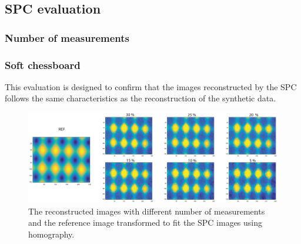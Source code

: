 \subsection{SPC evaluation}
\label{sec:eval_spc}

\subsubsection{Number of measurements}

\subsubsection{Soft chessboard}
This evaluation is designed to confirm that the images reconstructed by the SPC follows the same characteristics as the reconstruction of the synthetic data.

\begin{figure}[H]
    \centering
    \includegraphics[width=1\linewidth]{result/homo/Hom_im.eps}
    \caption{The reconstructed images with different number of measurements and the reference image transformed to fit the SPC images using homography.}
    \label{fig:hom_over_im}
\end{figure}

